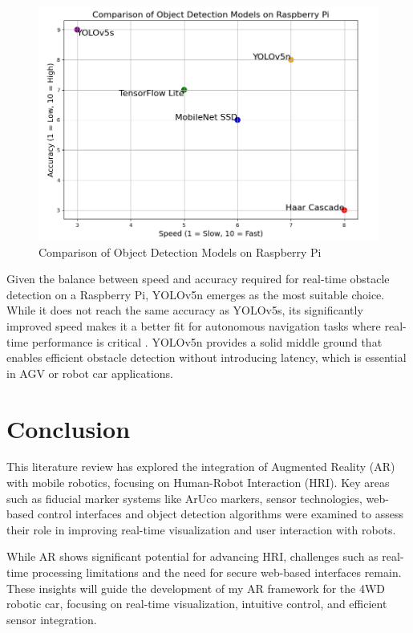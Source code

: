 \begin{figure}[H]
	\centering
	\includegraphics[width=0.74\linewidth]{ch2/figs/Comparison.png}
	\caption{Comparison of Object Detection Models on Raspberry Pi}
	\label{fig:object_detection_comparison}
\end{figure}

Given the balance between speed and accuracy required for real-time obstacle detection on a Raspberry Pi, YOLOv5n emerges as the most suitable choice. While it does not reach the same accuracy as YOLOv5s, its significantly improved speed makes it a better fit for autonomous navigation tasks where real-time performance is critical \cite{MuhammadYolo}. YOLOv5n provides a solid middle ground that enables efficient obstacle detection without introducing latency, which is essential in AGV or robot car applications.


\section{Conclusion}

This literature review has explored the integration of Augmented Reality (AR) with mobile robotics, focusing on Human-Robot Interaction (HRI). Key areas such as fiducial marker systems like ArUco markers, sensor technologies, web-based control interfaces and object detection algorithms were examined to assess their role in improving real-time visualization and user interaction with robots.

While AR shows significant potential for advancing HRI, challenges such as real-time processing limitations and the need for secure web-based interfaces remain. These insights will guide the development of my AR framework for the 4WD robotic car, focusing on real-time visualization, intuitive control, and efficient sensor integration.
